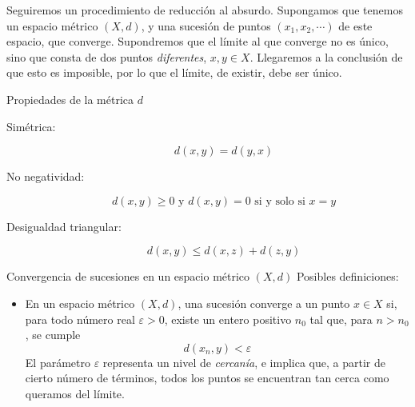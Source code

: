 \documentclass[a4paper,10pt]{article}
\begin{document}
\begin{soluc}

  \hspace{1em} Seguiremos un procedimiento de reducción al absurdo.
  Supongamos que tenemos un espacio métrico $\left(X,d\right)$, y una sucesión
  de puntos $(x_1, x_2, \cdots)$ de este espacio, que converge.
  Supondremos que el límite al que converge no es único, sino que consta de dos
  puntos \emph{diferentes}, $x, y\in X$. Llegaremos a la conclusión de que esto
  es imposible, por lo que el límite, de existir, debe ser único.

  \bigskip
  \begin{cutebox}[colbacktitle=gray!60!green]{\large Propiedades de la métrica $d$}
    \begin{description}
    \item[Simétrica: ]
      \begin{equation}\label{eq:simetrica}
        d(x, y) = d(y, x)
      \end{equation}
    \item[No negatividad: ]
      \begin{equation}
        d(x, y) \geq 0 \text{ y } d(x, y) = 0 \text{ si y solo si } x = y
      \end{equation}
    \item[Desigualdad triangular: ]
      \begin{equation}\label{eq:desigualdadtriangular}
        d(x,y) \leq d(x,z) + d(z,y)
      \end{equation}
    \end{description}
  \end{cutebox} %
  
  \medskip
  \begin{cutebox}[colbacktitle=gray!60!green]
    {\large Convergencia de sucesiones en un espacio métrico $(X,d)$}
    Posibles definiciones:
    \begin{itemize}
    \item En un espacio métrico $(X, d)$, una sucesión converge a un punto
      $x\in X$ si, para todo número real $\varepsilon > 0$, existe un entero
      positivo $n_0$ tal que, para $n > n_0$, se cumple
      \[
        d(x_n, y) < \varepsilon
      \]
      El parámetro $\varepsilon$ representa un nivel de \emph{cercanía}, e
      implica que, a partir de cierto número de términos, todos los puntos
      se encuentran tan cerca como queramos del límite.
      

\end{itemize}
\end{cutebox}
\end{soluc}
\end{document}
